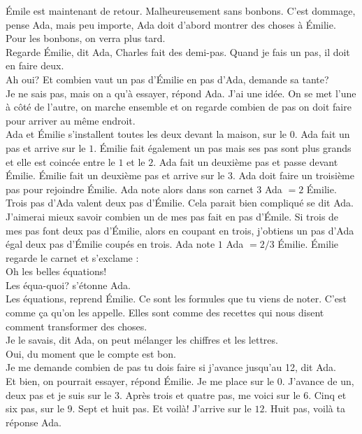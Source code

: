 Émile est maintenant de retour. Malheureusement sans bonbons. C’est dommage, pense Ada, mais peu importe, Ada doit d’abord montrer des choses à Émilie. Pour les bonbons, on verra plus tard.\\
\guillemotleft Regarde Émilie, dit Ada, Charles fait des demi-pas. Quand je fais un pas, il doit en faire deux.\\
\mdash Ah oui? Et combien vaut un pas d’Émilie en pas d’Ada, demande sa tante?\\
\mdash Je ne sais pas, mais on a qu’à essayer, répond Ada. J’ai une idée. On se met l’une à côté de l’autre, on marche ensemble et on regarde combien de pas on doit faire pour arriver au même endroit.\guillemotright\\
Ada et Émilie s’installent toutes les deux devant la maison, sur le $0$. Ada fait un pas et arrive sur le $1$. Émilie fait également un pas mais ses pas sont plus grands et elle est coincée entre le $1$ et le $2$.
Ada fait un deuxième pas et passe devant Émilie. Émilie fait un deuxième pas et arrive sur le $3$.  Ada doit faire un troisième pas pour rejoindre Émilie.
Ada note alors dans son carnet $3$ Ada $= 2$ Émilie. Trois pas d’Ada valent deux pas d’Émilie. Cela parait bien compliqué se dit Ada. J’aimerai mieux savoir combien un de mes pas fait en pas d’Émile. Si trois de mes pas font deux pas d’Émilie, alors en coupant en trois, j'obtiens un pas d’Ada égal deux pas d’Émilie coupés en trois. Ada note $1$ Ada $= 2/3$ Émilie.
Émilie regarde le carnet et s’exclame : \\
\guillemotleft Oh les belles équations!\\
\mdash Les équa-quoi? s’étonne Ada.\\
\mdash Les équations, reprend Émilie. Ce sont les formules que tu viens de noter. C’est comme ça qu'on les appelle. Elles sont comme des recettes qui nous disent comment transformer des choses.\\
\mdash Je le savais, dit Ada, on peut mélanger les chiffres et les lettres.\\
\mdash Oui, du moment que le compte est bon.\\
\mdash Je me demande combien de pas tu dois faire si j’avance jusqu’au 12, dit Ada.\\
\mdash Et bien, on pourrait essayer, répond Émilie. Je me place sur le $0$. J’avance de un, deux pas et je suis sur le $3$. Après trois et quatre pas, me voici sur le $6$. Cinq et six pas, sur le $9$. Sept et huit pas. Et voilà! J’arrive sur le $12$. Huit pas, voilà ta réponse Ada.\\
